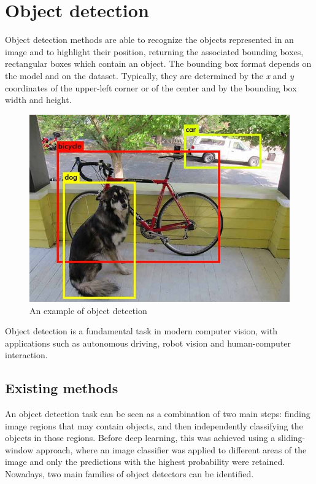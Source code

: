\documentclass[%
    corpo=12pt,
    twoside,
    stile=classica,   
    tipotesi=magistrale,
    evenboxes,
    english
]{toptesi}
\begin{document}
\section{Object detection}\label{sec:detection}
Object detection methods are able to recognize the objects represented in an image and to highlight their position, returning the associated bounding boxes, rectangular boxes which contain an object. The bounding box format depends on the model and on the dataset. Typically, they are determined by the \textit{x} and \textit{y} coordinates of the upper-left corner
or of the center
and by the bounding box width and height.

\begin{figure}[ht]
	\centering
	\includegraphics[width=.5\textwidth]{imgs/yolo_detection.png}
	\caption{An example of object detection\cite{redmon2016look}}
\end{figure}

Object detection is a fundamental task in modern computer vision, with applications such as autonomous driving, robot vision and human-computer interaction.

\subsection{Existing methods}\label{sec:detectors}
An object detection task can be seen as a combination of two main steps: finding image regions that may contain objects, and then independently classifying the objects in those regions. Before deep learning, this was achieved using a sliding-window approach, where an image classifier was applied to different areas of the image and only the predictions with the highest probability were retained. Nowadays, two main families of object detectors can be identified.
\end{document}
